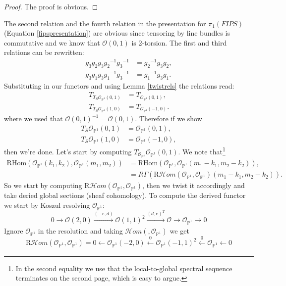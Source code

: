 \documentclass[oneside,reqno]{amsart}
\theoremstyle{definition}
\theoremstyle{definition}
\theoremstyle{definition}
\theoremstyle{definition}
\newcommand{\PP}{\mathbb{P}}
\newcommand{\Os}{\mathcal{O}}
\begin{document}
\begin{proof}
    The proof is obvious.
\end{proof}
The second relation and the fourth relation in the presentation for $\pi_1(FIPS)$ (Equation \eqref{fipspresentation}) are obvious since tensoring by line bundles is commutative and we know that $\Os(0,1)$ is 2-torsion. The first and third relations can be rewritten:
\begin{align*}
    g_3 g_2 g_3 {g_2}^{-1} {g_3}^{-1} &= {g_2}^{-1}g_3 g_2,\\
    g_3 g_1 g_3 {g_1}^{-1} {g_3}^{-1} &= {g_1}^{-1}g_3 g_1 .
\end{align*}
Substituting in our functors and using Lemma \ref{twistrels} the relations read:
\begin{align*}
    T_{T_{S} {\Os_{\PP^1}(0,1)}} &= T_{\Os_{\PP^1}(0,1)},\\
    T_{T_{S} \Os_{\PP^1}(1,0)} &= T_{\Os_{\PP^1}(-1,0)}.
\end{align*}
where we used that $\Os(0,1)^{-1} = \Os(0,1)$. Therefore if we show
\begin{align}
    T_{S} \Os_{\PP^1}(0,1)&= \Os_{\PP^1}(0,1), 
    \label{rel1}\\
    \label{rel2} T_{S} \Os_{\PP^1}(1,0) &= \Os_{\PP^1}(-1,0),
\end{align}
then we're done. Let's start by computing $T_{\Os_{\PP^1}}\Os_{\PP^1}(0,1)$. We note that\footnote{In the second equality we use that the local-to-global spectral sequence terminates on the second page, which is easy to argue.}
\begin{align*}
    \text{RHom}(\Os_{\PP^1}(k_1, k_2),\Os_{\PP^1}(m_1,m_2)) &= \text{RHom}(\Os_{\PP^1},\Os_{\PP^1}(m_1 - k_1, m_2 - k_2)), \\
    &=R\Gamma \left(\text{R}\mathcal{H}om(\Os_{\PP^1},\Os_{\PP^1})(m_1 - k_1, m_2 - k_2) \right).
\end{align*}
So we start by computing $\text{R}\mathcal{H}om(\Os_{\PP^1},\Os_{\PP^1})$, then we twist it accordingly and take deried global sections (sheaf cohomology). To compute the derived functor we start by Koszul resolving $\Os_{\PP^1}$:
\begin{equation*}
0 \xrightarrow[]{} \Os(2,0) \xrightarrow[]{(-e,d)} \Os(1,1)^2\xrightarrow[]{(d,e)^T} \Os \xrightarrow[]{} \Os_{\PP^1} \xrightarrow[] {}0
\end{equation*}
Ignore $\Os_{\PP^1}$ in the resolution and taking $\mathcal{H}om(, \Os_{\PP^1})$ we get
\begin{equation}
\label{koszul}
\text{R}\mathcal{H}om(\Os_{\PP^1},\Os_{\PP^1}) = 0 \xleftarrow[]{} \Os_{\PP^1}(-2,0) \xleftarrow[]{0} \Os_{\PP^1}(-1,1)^2\xleftarrow[]{0} \Os_{\PP^1} \xleftarrow[]{} 0
\end{equation}
\end{document}
